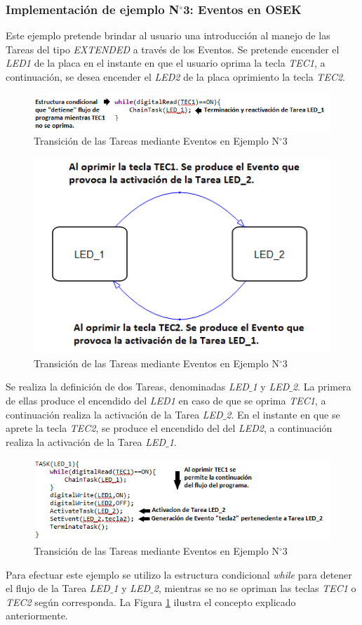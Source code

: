 \documentclass[12pt,letterpaper]{article}
\begin{document}
\subsubsection{Implementación de ejemplo N$^{\circ}$3: Eventos en OSEK}
Este ejemplo pretende brindar al usuario una introducción al manejo de las Tareas del tipo \textit{EXTENDED} a través de los Eventos. Se pretende encender el \textit{LED1} de la placa en el instante en que el usuario oprima la tecla \textit{TEC1}, a continuación, se desea encender el \textit{LED2} de la placa oprimiento la tecla \textit{TEC2}.
\begin{center}
\begin{figure}[!h]
\centering
\includegraphics[width=10 cm]{figuras/f41.png}
\caption{Transición de las Tareas mediante Eventos en Ejemplo N$^{\circ}$3}
\label{ejemplo3}
\end{figure}
\end{center}
\begin{figure}[!h]
\centering
\includegraphics[width=9 cm]{figuras/f26.png}
\caption{Transición de las Tareas mediante Eventos en Ejemplo N$^{\circ}$3}
\label{Fig41}
\end{figure}
Se realiza la definición de dos Tareas, denominadas \textit{LED$\_$1} y \textit{LED$\_$2}. La primera de ellas produce el encendido del \textit{LED1} en caso de que se oprima \textit{TEC1}, a continuación realiza la activación de la Tarea \textit{LED$\_$2}. En el instante en que se aprete la tecla \textit{TEC2}, se produce el encendido del del \textit{LED2}, a continuación realiza la activación de la Tarea \textit{LED$\_$1}.
\begin{figure}[!h]
\centering
\includegraphics[width=8 cm]{figuras/f42.png}
\caption{Transición de las Tareas mediante Eventos en Ejemplo N$^{\circ}$3}
\label{ejemplo3transicion}
\end{figure}
Para efectuar este ejemplo se utilizo la estructura condicional \textit{while} para detener el flujo de la Tarea \textit{LED$\_$1} y \textit{LED$\_$2}, mientras se no se opriman las teclas \textit{TEC1} o \textit{TEC2} según corresponda. La Figura \ref{ejemplo3} ilustra el concepto explicado anteriormente.
\end{document}
